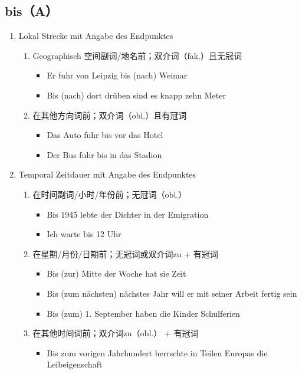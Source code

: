 \documentclass[UTF8]{report}
\begin{document}
\subsection{bis（A）}
\begin{enumerate}
    \item Lokal Strecke mit Angabe des Endpunktes
    \begin{enumerate}
        \item Geographisch 空间副词/地名前；双介词（fak.）且无冠词
        \begin{itemize}
            \item Er fuhr von Leipzig bis (nach) Weimar
            \item Bis (nach) dort drüben sind es knapp zehn Meter
        \end{itemize}
        \item 在其他方向词前；双介词（obl.）且有冠词
        \begin{itemize}
            \item Das Auto fuhr bis vor das Hotel
            \item Der Bus fuhr bis in das Stadion
        \end{itemize}
    \end{enumerate} 
    \item Temporal Zeitdauer mit Angabe des Endpunktes
    \begin{enumerate}
        \item 在时间副词/小时/年份前；无冠词（obl.）
        \begin{itemize}
            \item Bis 1945 lebte der Dichter in der Emigration
            \item Ich warte bis 12 Uhr
        \end{itemize}
        \item 在星期/月份/日期前；无冠词或双介词zu + 有冠词
        \begin{itemize}
            \item Bis (zur) Mitte der Woche hat sie Zeit
            \item Bis (zum nächsten) nächstes Jahr will er mit seiner Arbeit fertig sein
            \item Bis (zum) 1. September haben die Kinder Schulferien
        \end{itemize}
        \item 在其他时间词前；双介词zu（obl.） + 有冠词
        \begin{itemize}
            \item Bis zum vorigen Jahrhundert herrschte in Teilen Europas die Leibeigenschaft

\end{itemize}
\end{enumerate}
\end{enumerate}
\end{document}
